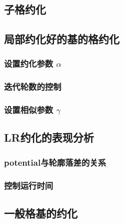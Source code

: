 \documentclass[UTF8]{ctexart}
\begin{document}
    \subsection{子格约化}

    \subsection{局部约化好的基的格约化}

        \subsubsection{设置约化参数 $ \alpha $}

        \subsubsection{迭代轮数的控制}

        \subsubsection{设置相似参数 $\gamma$}

    \subsection{LR约化的表现分析}

        \subsubsection{potential与轮廓落差的关系}

        \subsubsection{控制运行时间}

    \subsection{一般格基的约化}
\end{document}
